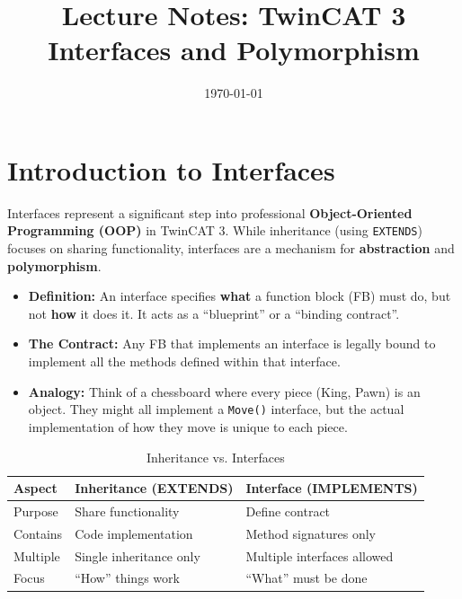 \documentclass[11pt,a4paper]{article}
\title{
    \vspace{-1cm}
    \textbf{Lecture Notes: TwinCAT 3}\\
    \Large Interfaces and Polymorphism
}
\author{}
\date{\today}
\begin{document}
\maketitle

\tableofcontents
\newpage

\section{Introduction to Interfaces}

Interfaces represent a significant step into professional \textbf{Object-Oriented Programming (OOP)} in TwinCAT 3. While inheritance (using \texttt{EXTENDS}) focuses on sharing functionality, interfaces are a mechanism for \textbf{abstraction} and \textbf{polymorphism}.

\begin{itemize}[leftmargin=*]
    \item \textbf{Definition:} An interface specifies \textbf{what} a function block (FB) must do, but not \textbf{how} it does it. It acts as a ``blueprint'' or a ``binding contract''.
    
    \item \textbf{The Contract:} Any FB that implements an interface is legally bound to implement all the methods defined within that interface.
    
    \item \textbf{Analogy:} Think of a chessboard where every piece (King, Pawn) is an object. They might all implement a \texttt{Move()} interface, but the actual implementation of how they move is unique to each piece.
\end{itemize}

\begin{table}[h]
\centering
\begin{tabular}{@{}lll@{}}
\toprule
\textbf{Aspect} & \textbf{Inheritance (EXTENDS)} & \textbf{Interface (IMPLEMENTS)} \\
\midrule
Purpose & Share functionality & Define contract \\
Contains & Code implementation & Method signatures only \\
Multiple & Single inheritance only & Multiple interfaces allowed \\
Focus & ``How'' things work & ``What'' must be done \\
\bottomrule
\end{tabular}
\caption{Inheritance vs. Interfaces}
\end{table}
\end{document}
